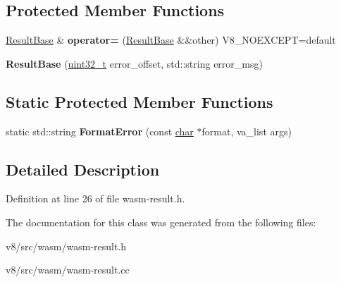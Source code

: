 \subsection*{Protected Member Functions}
\begin{DoxyCompactItemize}
\item 
\mbox{\label{classv8_1_1internal_1_1wasm_1_1ResultBase_a81f835aed70c61f0e4a1b974ed9893f3}} 
\mbox{\hyperlink{classv8_1_1internal_1_1wasm_1_1ResultBase}{Result\+Base}} \& {\bfseries operator=} (\mbox{\hyperlink{classv8_1_1internal_1_1wasm_1_1ResultBase}{Result\+Base}} \&\&other) V8\+\_\+\+N\+O\+E\+X\+C\+E\+PT=default
\item 
\mbox{\label{classv8_1_1internal_1_1wasm_1_1ResultBase_a454cea01dd7c39726a1a8b8d1acf31f3}} 
{\bfseries Result\+Base} (\mbox{\hyperlink{classuint32__t}{uint32\+\_\+t}} error\+\_\+offset, std\+::string error\+\_\+msg)
\end{DoxyCompactItemize}
\subsection*{Static Protected Member Functions}
\begin{DoxyCompactItemize}
\item 
\mbox{\label{classv8_1_1internal_1_1wasm_1_1ResultBase_ab7ee80b7811d525dc932170e88e2364e}} 
static std\+::string {\bfseries Format\+Error} (const \mbox{\hyperlink{classchar}{char}} $\ast$format, va\+\_\+list args)
\end{DoxyCompactItemize}


\subsection{Detailed Description}


Definition at line 26 of file wasm-\/result.\+h.



The documentation for this class was generated from the following files\+:\begin{DoxyCompactItemize}
\item 
v8/src/wasm/wasm-\/result.\+h\item 
v8/src/wasm/wasm-\/result.\+cc\end{DoxyCompactItemize}
